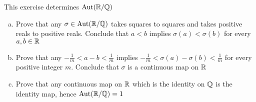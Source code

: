 \begin{exercise}
    This exercise determines $\operatorname{Aut}(\mathbb{R}/\mathbb{Q})$
    \begin{enumerate}[(a)]
        \item Prove that any $\sigma \in \operatorname{Aut}(\mathbb{R}/\mathbb{Q})$ takes squares to squares and takes positive reals to positive reals. Conclude that $a < b$ implies $\sigma(a) < \sigma(b)$ for every $a, b \in \mathbb{R}$
        
        \item Prove that any $-\frac{1}{m} < a - b < \frac{1}{m}$ implies $-\frac{1}{m} < \sigma(a) - \sigma(b) < \frac{1}{m}$ for every positive integer $m$. Conclude that $\sigma$ is a continuous map on $\mathbb{R}$
        
        \item Prove that any continuous map on $\mathbb{R}$ which is the identity on $\mathbb{Q}$ is the identity map, hence $\operatorname{Aut}(\mathbb{R}/\mathbb{Q}) = 1$
    \end{enumerate}
\end{exercise}
